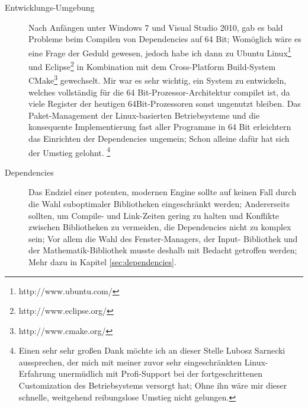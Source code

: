\begin{description}

	\item[Entwicklungs-Umgebung]
	Nach Anfängen unter Windows 7 und Visual Studio 2010, gab es bald Probleme beim Compilen von Dependencies auf 
	64 Bit; Womöglich wäre es eine Frage der Geduld gewesen, jedoch habe ich dann zu 
	Ubuntu Linux\footnote{http://www.ubuntu.com/} und Eclipse\footnote{http://www.eclipse.org/} in 
	Kombination mit dem Cross-Platform Build-System CMake\footnote{http://www.cmake.org/} gewechselt. Mir war es sehr 	
	wichtig, ein System zu entwickeln, welches vollständig für die 64 Bit-Prozessor-Architektur compilet ist, da viele 
	Register der heutigen 64Bit-Prozessoren sonst ungenutzt bleiben.
	Das Paket-Management der Linux-basierten Betriebsysteme und die konsequente Implementierung fast aller Programme in 64 
	Bit erleichtern das Einrichten der Dependencies ungemein; Schon alleine dafür hat sich der Umstieg 
	gelohnt.
	\footnote{Einen sehr sehr großen Dank möchte ich an dieser Stelle Lubosz Sarnecki aussprechen, der mich mit 
	meiner zuvor sehr eingeschränkten Linux-Erfahrung unermüdlich mit Profi-Support bei der fortgeschrittenen Customization 
	des Betriebsystems versorgt hat; Ohne ihn wäre mir dieser schnelle, weitgehend reibungslose Umstieg nicht gelungen.}

	\item[Dependencies]
	\label{focus:dependencies}
	Das Endziel einer potenten, modernen Engine sollte auf keinen Fall durch die Wahl suboptimaler Bibliotheken 
	eingeschränkt werden; Andererseits sollten, um Compile- und Link-Zeiten gering zu halten und Konflikte zwischen 
	Bibliotheken zu vermeiden, die Dependencies nicht zu komplex sein; Vor allem die Wahl des Fenster-Managers, der Input-
	Bibliothek und der Mathematik-Bibliothek musste deshalb mit Bedacht getroffen werden; Mehr dazu in Kapitel 
	\ref{sec:dependencies}.
	
	
	

\end{description}
